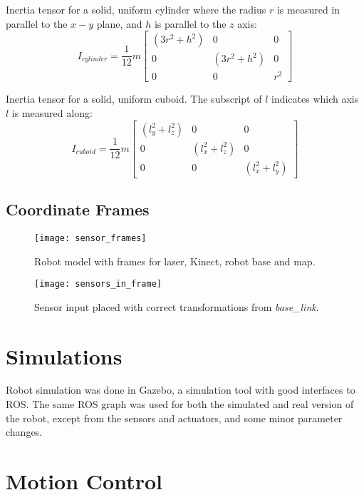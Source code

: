 Inertia tensor for a solid, uniform cylinder where the radius $r$ is measured in parallel to the $x - y$ plane, and $h$ is parallel to the $z$ axis:
\begin{equation}
I_{cylinder} = \frac{1}{12}m \begin{bmatrix}
	(3 r^2 + h^2) & 0 & 0 \\[0.3em]
	0 & (3 r^2 + h^2) & 0 \\[0.3em]
	0 & 0 & r^2
	\end{bmatrix}
\end{equation}

Inertia tensor for a solid, uniform cuboid. The subscript of $l$ indicates which axis $l$ is measured along:
\begin{equation}
I_{cuboid} = \frac{1}{12}m \begin{bmatrix}
	(l_y^2 + l_z^2) & 0 & 0 \\[0.3em]
	0 & (l_x^2 + l_z^2) & 0 \\[0.3em]
	0 & 0 & (l_x^2 + l_y^2)
\end{bmatrix}
\end{equation}

\subsection{Coordinate Frames}

\begin{figure}[p]
	\centering
	\texttt{[image: sensor\_frames]}
	\caption{Robot model with frames for laser, Kinect, robot base and map. }
	\label{fig:sensor_frames}
\end{figure}

\begin{figure}[p]
	\centering
	\texttt{[image: sensors\_in\_frame]}
	\caption{Sensor input placed with correct transformations from \textit{base\_link}. }
	\label{fig:sensors_in_frame}
\end{figure}


\section{Simulations}

Robot simulation was done in Gazebo, a simulation tool with good interfaces to \ac{ROS}. The same \ac{ROS} graph was used for both the simulated and real version of the robot, except from the sensors and actuators, and some minor parameter changes. 

\section{Motion Control}

